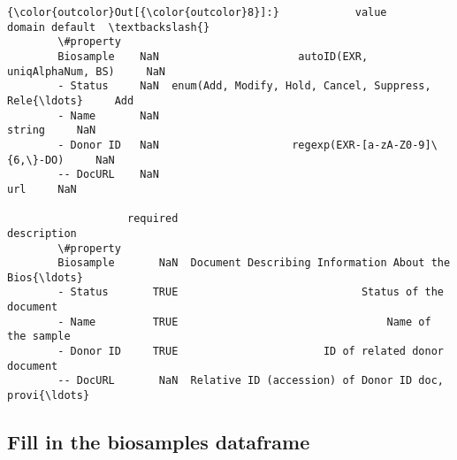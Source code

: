 \documentclass[11pt]{article}
\begin{document}
\begin{Verbatim}[commandchars=\\\{\}]
{\color{outcolor}Out[{\color{outcolor}8}]:}            value                                             domain default  \textbackslash{}
        \#property                                                                     
        Biosample    NaN                      autoID(EXR, uniqAlphaNum, BS)     NaN   
        - Status     NaN  enum(Add, Modify, Hold, Cancel, Suppress, Rele{\ldots}     Add   
        - Name       NaN                                             string     NaN   
        - Donor ID   NaN                     regexp(EXR-[a-zA-Z0-9]\{6,\}-DO)     NaN   
        -- DocURL    NaN                                                url     NaN   
        
                   required                                        description  
        \#property                                                               
        Biosample       NaN  Document Describing Information About the Bios{\ldots}  
        - Status       TRUE                             Status of the document  
        - Name         TRUE                                 Name of the sample  
        - Donor ID     TRUE                       ID of related donor document  
        -- DocURL       NaN  Relative ID (accession) of Donor ID doc, provi{\ldots}  
\end{Verbatim}
            
    \subsection{Fill in the biosamples
dataframe}\label{fill-in-the-biosamples-dataframe}
\end{document}

